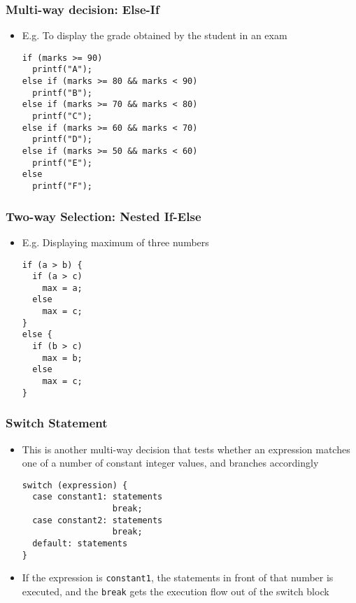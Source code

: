 \documentclass[11pt]{beamer}
\begin{document}
\begin{frame}[fragile]\frametitle{Multi-way decision: Else-If}
\label{sec-1-6}

\begin{itemize}
\item E.g. To display the grade obtained by the student in an exam

\begin{verbatim}
if (marks >= 90)
  printf("A");
else if (marks >= 80 && marks < 90)
  printf("B");
else if (marks >= 70 && marks < 80)
  printf("C");
else if (marks >= 60 && marks < 70)
  printf("D");
else if (marks >= 50 && marks < 60)
  printf("E");
else 
  printf("F");
\end{verbatim}
\end{itemize}
\end{frame}
\begin{frame}[fragile]\frametitle{Two-way Selection: Nested If-Else}
\label{sec-1-7}

\begin{itemize}
\item E.g. Displaying maximum of three numbers

\begin{verbatim}
if (a > b) {
  if (a > c)
    max = a;
  else
    max = c;
}
else {
  if (b > c)
    max = b;
  else
    max = c;
}
\end{verbatim}
\end{itemize}
\end{frame}
\begin{frame}[fragile]\frametitle{Switch Statement}
\label{sec-1-8}

\begin{itemize}
\item This is another multi-way decision that tests whether an expression matches one of a number of constant integer values, and branches accordingly

\begin{verbatim}
switch (expression) {
  case constant1: statements
                  break;
  case constant2: statements
                  break;
  default: statements
}
\end{verbatim}
\item If the expression is \verb~constant1~, the statements in front of that number is executed, and the \verb~break~ gets the execution flow out of the switch block
\end{itemize}
\end{frame}
\end{document}
